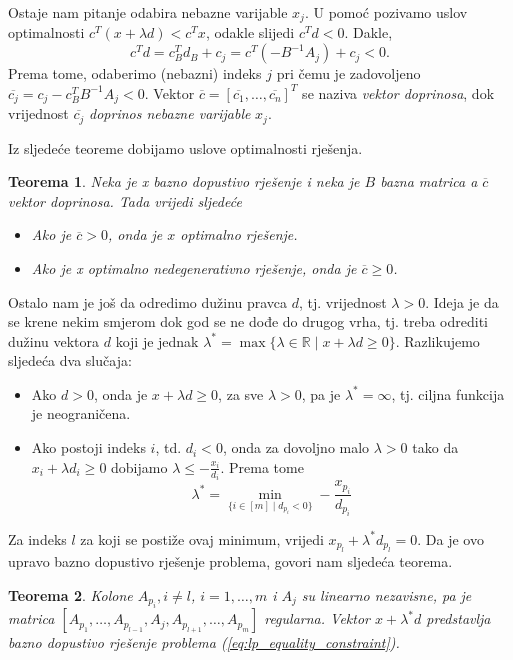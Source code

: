 \documentclass[a4paper, utf8, 11pt, colorlinks]{book}
\newtheorem{thm}{Teorema}
\begin{document}
 Ostaje nam pitanje odabira nebazne varijable $x_j$. U pomoć pozivamo uslov optimalnosti $c^T ( x + \lambda d ) < c^T x $, odakle slijedi $c^T d < 0$.  Dakle, $$c^T d = c_B^T d_B + c_j = c^T ( - B^{-1} A_j ) + c_j < 0.$$
 Prema tome, odaberimo (nebazni) indeks $j$ pri čemu je zadovoljeno $ \overline{c_j} = c_j - c_B^T B^{-1}A_j < 0$. Vektor $\overline{c}=[\overline{c_1}, \ldots, \overline{c_n}]^T$ se naziva \emph{vektor doprinosa}, dok vrijednost $\overline{c_j}$ \emph{doprinos nebazne varijable} $x_j$. 
 
Iz sljedeće teoreme dobijamo uslove optimalnosti rješenja.

\begin{thm}
  Neka je x bazno dopustivo rješenje i neka je $B$ bazna matrica a $\overline{c}$ vektor doprinosa. Tada vrijedi sljedeće
  \begin{itemize}
      \item Ako je $\overline{c} >0$, onda je $x$ optimalno rješenje.
      \item Ako je x optimalno nedegenerativno rješenje, onda je $\overline{c} \geq 0$.
  \end{itemize}
\end{thm}

Ostalo nam je još da odredimo dužinu   pravca $d$, tj. vrijednost $\lambda>0$. Ideja je da se krene nekim smjerom dok god se ne dođe do drugog vrha, tj. treba odrediti dužinu vektora $d$ koji je jednak $\lambda^* = \max \{ \lambda \in \mathbb{R} \mid x + \lambda d \geq 0 \}$. Razlikujemo sljedeća dva slučaja:
\begin{itemize}
    \item Ako $d >0$, onda je $  x + \lambda d \geq 0$, za sve $\lambda > 0$, pa je $\lambda^* = \infty$, tj. ciljna funkcija je neograničena.
    \item Ako postoji indeks $i$, td. $d_i < 0$, onda za dovoljno malo $\lambda>0$ tako da $x_i + \lambda d_i \geq 0$ dobijamo $\lambda \leq -\frac{x_i}{d_i}$. Prema tome 
    $$ \lambda^* = \min_{ \{i\in [m] \mid d_{p_i} < 0  \}} - \frac{x_{p_i}}{d_{p_i}} $$
\end{itemize}
Za indeks $l$ za koji se postiže ovaj minimum, vrijedi $x_{p_l} + \lambda^* d_{p_l}=0$.
Da je ovo upravo bazno dopustivo rješenje problema, govori nam sljedeća teorema. 
\begin{thm}
    Kolone $A_{p_i}, i\not = l$, $i=1,\ldots,m$ i $A_{j}$ su linearno nezavisne, pa je matrica 
    $[A_{p_1},\ldots, A_{p_{l-1}}, A_j, A_{p_{l+1}}, \ldots, A_{p_m}]$
    regularna. Vektor $x + \lambda^* d$ predstavlja bazno dopustivo rješenje problema (\ref{eq:lp_equality_constraint}). 
\end{thm}
\end{document}
